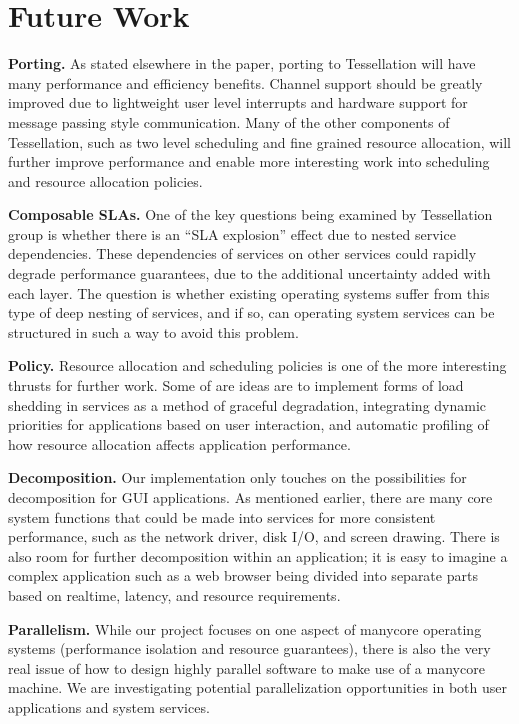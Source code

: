 \documentclass[letterpaper,twocolumn,11pt]{article}
\begin{document}
\section{Future Work}

\textbf{Porting.} As stated elsewhere in the paper, porting to Tessellation will have many performance and efficiency benefits. Channel support should be greatly improved due to lightweight user level interrupts and hardware support for message passing style communication. Many of the other components of Tessellation, such as two level scheduling and fine grained resource allocation, will further improve performance and enable more interesting work into scheduling and resource allocation policies.

\textbf{Composable SLAs.} One of the key questions being examined by Tessellation group is whether there is an ``SLA explosion'' effect due to nested service dependencies. These dependencies of services on other services could rapidly degrade performance guarantees, due to the additional uncertainty added with each layer. The question is whether existing operating systems suffer from this type of deep nesting of services, and if so, can operating system services can be structured in such a way to avoid this problem.

\textbf{Policy.} Resource allocation and scheduling policies is one of the more interesting thrusts for further work. Some of are ideas are to implement forms of load shedding in services as a method of graceful degradation, integrating dynamic priorities for applications based on user interaction, and automatic profiling of how resource allocation affects application performance.

\textbf{Decomposition.} Our implementation only touches on the possibilities for decomposition for GUI applications. As mentioned earlier, there are many core system functions that could be made into services for more consistent performance, such as the network driver, disk I/O, and screen drawing. There is also room for further decomposition within an application; it is easy to imagine a complex application such as a web browser being divided into separate parts based on realtime, latency, and resource requirements.

\textbf{Parallelism.} While our project focuses on one aspect of manycore operating systems (performance isolation and resource guarantees), there is also the very real issue of how to design highly parallel software to make use of a manycore machine. We are investigating potential parallelization opportunities in both user applications and system services.
\end{document}
